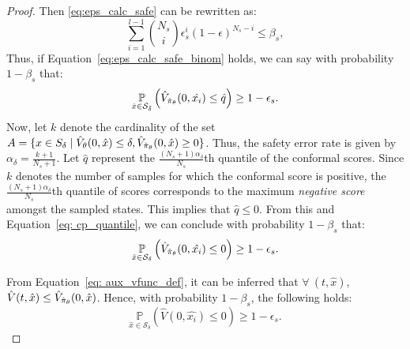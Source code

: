 \begin{proof}
Then \eqref{eq:eps_calc_safe} can be rewritten as: 
\begin{equation} \label{eq:eps_calc_safe_binom}
    \sum_{i=1}^{l-1} \binom{N_s}{i} \epsilon_s^i (1 - \epsilon)^{N_s - i} \leq \beta_s,
\end{equation}
Thus, if Equation~\eqref{eq:eps_calc_safe_binom} holds, we can say with probability $1-\beta_s$ that:
\begin{equation}\label{eq: cp_quantile}
    \underset{\hat{x} \in \mathcal{S}_{\tilde\delta}}{\mathbb{P}}\left(\hat{V}_{\hat{\pi}_{\theta}}(0, \hat{x_i}) \leq \hat{q} \right) \geq 1-\epsilon_s.
\end{equation}
Now, let $k$ denote the cardinality of the set  
$A = \{x \in S_{\delta} \mid \hat{V}_{\theta}(0, \hat{x}) \leq \delta ,\hat{V}_{\hat{\pi}_{\theta}}(0 , \hat{x}) \geq 0\}$. Thus, the safety error rate is given by  $ \alpha_{\delta} = \frac{k+1}{N_s+1}$.
Let $\hat{q}$ represent the $\frac{(N_s+1)\alpha_{\delta}}{N_s}$th quantile of the conformal scores. Since $k$ denotes the number of samples for which the conformal score is positive, the $\frac{(N_s+1)\alpha_{\delta}}{N_s}$th quantile of scores corresponds to the maximum \textit{negative score} amongst the sampled states. This implies that $\hat{q} \leq 0$. From this and Equation~\eqref{eq: cp_quantile}, we can conclude with probability $1 - \beta_s$ that:
\begin{equation*}
    \underset{\hat{x} \in \mathcal{S}_{\delta}}{\mathbb{P}}\left(\hat{V}_{\hat{\pi}_{\theta}}(0, \hat{x_i}) \leq 0 \right) \geq 1-\epsilon_s.
\end{equation*}

From Equation~\eqref{eq: aux_vfunc_def}, it can be inferred that $\forall~(t, \hat{x})$, $\hat{V}(t, \hat{x}) \leq \hat{V}_{\hat{\pi}_{\theta}}(0, \hat{x})$. Hence, with probability $1 - \beta_s$, the following holds:
\begin{equation*}
    \underset{\hat{x} \in \mathcal{S}_{\delta}}{\mathbb{P}}\left(\hat{V}(0, \hat{x_i}) \leq 0 \right) \geq 1-\epsilon_s.
\end{equation*}
\end{proof}



